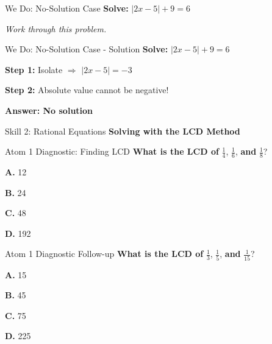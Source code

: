 \documentclass[12pt]{beamer}
\begin{document}
\begin{frame}{We Do: No-Solution Case}
\textbf{Solve:} $|2x - 5| + 9 = 6$

\vspace{2cm}

\textit{Work through this problem.}
\end{frame}

\begin{frame}{We Do: No-Solution Case - Solution}
\textbf{Solve:} $|2x - 5| + 9 = 6$

\pause
\vspace{0.5cm}

\textbf{Step 1:} Isolate \pause $\Rightarrow$ $|2x - 5| = -3$

\pause
\vspace{0.5cm}

\textbf{Step 2:} Absolute value cannot be negative!

\pause
\vspace{0.5cm}

\Large
\textbf{Answer: No solution}
\end{frame}

\begin{frame}{Skill 2: Rational Equations}
\Large
\textbf{Solving with the LCD Method}
\end{frame}

\begin{frame}{Atom 1 Diagnostic: Finding LCD}
\textbf{What is the LCD of} $\displaystyle\frac{1}{4}$, $\displaystyle\frac{1}{6}$, \textbf{and} $\displaystyle\frac{1}{8}$?

\vspace{1cm}

\textbf{A.} 12

\textbf{B.} 24 \hfill {}

\textbf{C.} 48

\textbf{D.} 192
\end{frame}

\begin{frame}{Atom 1 Diagnostic Follow-up}
\textbf{What is the LCD of} $\displaystyle\frac{1}{3}$, $\displaystyle\frac{1}{5}$, \textbf{and} $\displaystyle\frac{1}{15}$?

\vspace{1cm}

\textbf{A.} 15 \hfill {}

\textbf{B.} 45

\textbf{C.} 75

\textbf{D.} 225
\end{frame}
\end{document}
